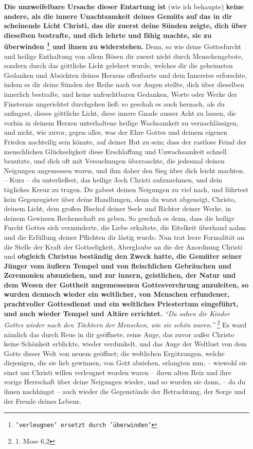 \textbf{Die unzweifelbare Ursache dieser Entartung ist} (wie ich behaupte)
\textbf{keine andere,
als die innere Unachtsamkeit deines Gemüts auf das in dir scheinende Licht
Christi, das dir zuerst deine Sünden zeigte, dich über dieselben bestrafte, und
dich lehrte und fähig machte, sie zu überwinden
\footnote{\texttt{'verleugnen' ersetzt durch 'überwinden'}}
und ihnen zu widerstehen.} Denn,
so wie deine Gottesfurcht und heilige Enthaltung von allem Bösen dir zuerst
nicht durch Menschengebote, sondern durch das göttliche Licht gelehret wurde,
welches dir die geheimsten Gedanken und Absichten deines Herzens offenbarte und
dein Innerstes erforschte, indem es dir deine Sünden der Reihe nach vor Augen
stellte, dich über dieselben innerlich bestrafte, und keine unfruchtbaren
Gedanken, Worte oder Werke der Finsternis ungerichtet durchgehen ließ; so
geschah es auch hernach, als du anfingest, dieses göttliche Licht, diese innere
Gnade ausser Acht zu lassen, die vorhin in deinem Herzen unterhaltene heilige
Wachsamkeit zu vernachlässigen, und nicht, wie zuvor, gegen alles, was der Ehre
Gottes und deinem eigenen Frieden nachteilig sein könnte, auf deiner Hut zu
sein; dass der rastlose Feind der menschlichen Glückseligkeit diese
Erschlaffung und Unwachsamkeit schnell benutzte, und dich oft mit Versuchungen
überraschte, die jedesmal deinen Neigungen angemessen waren, und ihm daher den
Sieg über dich leicht machten. -- Kurz -- du unterließest, das heilige Joch
Christi aufzunehmen, und dein tägliches Kreuz zu tragen. Du gabest deinen
Neigungen zu viel nach, und führtest kein Gegenregister über deine Handlungen,
denn du warst abgeneigt, Christo, deinem Licht, dem großen Bischof deiner
Seele und Richter deiner Werke, in deinem Gewissen Rechenschaft zu geben. So
geschah es denn, dass die heilige Furcht Gottes sich verminderte, die Liebe
erkaltete, die Eitelkeit überhand nahm und die Erfüllung deiner Pflichten dir
lästig wurde. Nun trat leere Formalität an die Stelle der Kraft der
Gottseligkeit, Aberglaube an die der Anordnung Christi und \textbf{obgleich
Christus
beständig den Zweck hatte, die Gemüter seiner Jünger vom äußern Tempel und von
fleischlichen Gebräuchen und Zeremonien abzuziehen, und zur innern, geistlichen,
der Natur und dem Wesen der Gottheit angemessenen Gottesverehrung anzuleiten, so
wurden dennoch wieder ein weltlicher, von Menschen erfundener, prachtvoller
Gottesdienst  und ein weltliches Priestertum
 eingeführt, und auch wieder Tempel 
und Altäre errichtet.}
\textit{"`Da sahen die Kinder Gottes wieder nach den Töchtern der
Menschen, wie sie schön waren."'}
\footnote{1. Mose 6,2}
Es ward nämlich das durch
Reue in dir geöffnete, reine Auge, das zuvor außer Christo keine Schönheit
erblickte, wieder verdunkelt, und das Auge der Weltlust von dem Gotte dieser
Welt von neuem geöffnet; die weltlichen Ergötzungen, welche diejenigen, die sie
lieb gewinnen, von Gott abziehen, erlangten nun, -- wiewohl sie einst um Christi
willen verleugnet worden waren -- ihren alten Reiz und ihre vorige Herrschaft
über deine Neigungen wieder, und so wurden sie dann, -- da du ihnen nachhingst
-- auch wieder die Gegenstände der Betrachtung, der Sorge und der Freude deines
Lebens.

